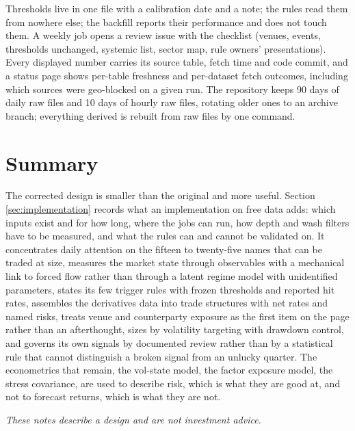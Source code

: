 \documentclass[11pt,a4paper]{article}
\theoremstyle{definition}
\begin{document}
Thresholds live in one file with a calibration date and a note; the rules read them from nowhere else; the backfill reports their performance and does not touch them. A weekly job opens a review issue with the checklist (venues, events, thresholds unchanged, systemic list, sector map, rule owners' presentations). Every displayed number carries its source table, fetch time and code commit, and a status page shows per-table freshness and per-dataset fetch outcomes, including which sources were geo-blocked on a given run. The repository keeps 90 days of daily raw files and 10 days of hourly raw files, rotating older ones to an archive branch; everything derived is rebuilt from raw files by one command.

\section{Summary}

The corrected design is smaller than the original and more useful. Section \ref{sec:implementation} records what an implementation on free data adds: which inputs exist and for how long, where the jobs can run, how depth and wash filters have to be measured, and what the rules can and cannot be validated on. It concentrates daily attention on the fifteen to twenty-five names that can be traded at size, measures the market state through observables with a mechanical link to forced flow rather than through a latent regime model with unidentified parameters, states its few trigger rules with frozen thresholds and reported hit rates, assembles the derivatives data into trade structures with net rates and named risks, treats venue and counterparty exposure as the first item on the page rather than an afterthought, sizes by volatility targeting with drawdown control, and governs its own signals by documented review rather than by a statistical rule that cannot distinguish a broken signal from an unlucky quarter. The econometrics that remain, the vol-state model, the factor exposure model, the stress covariance, are used to describe risk, which is what they are good at, and not to forecast returns, which is what they are not.

\vspace{1em}
\noindent\textit{These notes describe a design and are not investment advice.}
\end{document}

